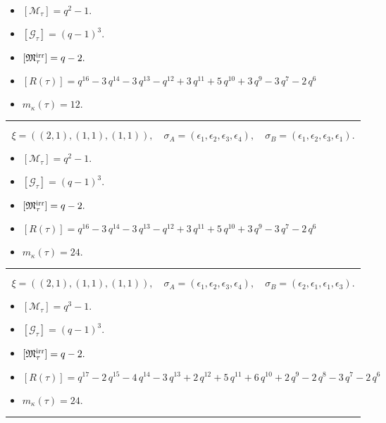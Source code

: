 \documentclass[10pt,a4paper]{amsart}
\begin{document}
\begin{itemize}
 \item $[\mathcal{M}_{\tau}] = q^{2} - 1 .$

 \item $[\mathcal{G}_{\tau}] = {\left(q - 1\right)}^{3} .$

 \item $[{\frak M}_{\tau}^{\textrm{irr}}] = q - 2 .$

 \item $[R(\tau)] = q^{16} - 3 \, q^{14} - 3 \, q^{13} - q^{12} + 3 \, q^{11} + 5 \, q^{10} + 3 \, q^{9} - 3 \, q^{7} - 2 \, q^{6} $

 \item $m_{\kappa}(\tau) = 12 .$

 \end{itemize}
\noindent\rule{8cm}{0.4pt}

$$\xi = ({(2, 1), (1, 1)}, {(1, 1)}),\quad \sigma_A = ({{\epsilon_1, \epsilon_2}, {\epsilon_3}}, {{\epsilon_4}}),\quad \sigma_B = ({{\epsilon_1, \epsilon_2}, {\epsilon_3}}, {{\epsilon_1}}).$$

\begin{itemize}
 \item $[\mathcal{M}_{\tau}] = q^{2} - 1 .$

 \item $[\mathcal{G}_{\tau}] = {\left(q - 1\right)}^{3} .$

 \item $[{\frak M}_{\tau}^{\textrm{irr}}] = q - 2 .$

 \item $[R(\tau)] = q^{16} - 3 \, q^{14} - 3 \, q^{13} - q^{12} + 3 \, q^{11} + 5 \, q^{10} + 3 \, q^{9} - 3 \, q^{7} - 2 \, q^{6} $

 \item $m_{\kappa}(\tau) = 24 .$

 \end{itemize}
\noindent\rule{8cm}{0.4pt}

$$\xi = ({(2, 1), (1, 1)}, {(1, 1)}),\quad \sigma_A = ({{\epsilon_1, \epsilon_2}, {\epsilon_3}}, {{\epsilon_4}}),\quad \sigma_B = ({{\epsilon_2, \epsilon_1}, {\epsilon_1}}, {{\epsilon_3}}).$$

\begin{itemize}
 \item $[\mathcal{M}_{\tau}] = q^{3} - 1 .$

 \item $[\mathcal{G}_{\tau}] = {\left(q - 1\right)}^{3} .$

 \item $[{\frak M}_{\tau}^{\textrm{irr}}] = q - 2 .$

 \item $[R(\tau)] = q^{17} - 2 \, q^{15} - 4 \, q^{14} - 3 \, q^{13} + 2 \, q^{12} + 5 \, q^{11} + 6 \, q^{10} + 2 \, q^{9} - 2 \, q^{8} - 3 \, q^{7} - 2 \, q^{6} $

 \item $m_{\kappa}(\tau) = 24 .$

 \end{itemize}
\noindent\rule{8cm}{0.4pt}
\end{document}
